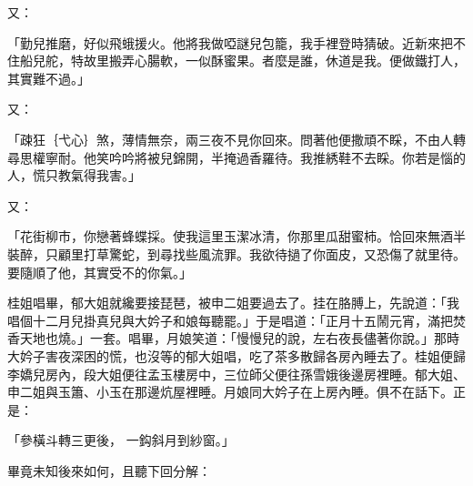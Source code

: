 又：

「勤兒推磨，好似飛蛾援火。他將我做啞謎兒包籠，我手裡登時猜破。近新來把不住船兒舵，特故里搬弄心腸軟，一似酥蜜果。者麼是誰，休道是我。便做鐵打人，其實難不過。」

又：

「疎狂｛弋心｝煞，薄情無奈，兩三夜不見你回來。問著他便撒頑不睬，不由人轉尋思權寧耐。他笑吟吟將被兒錦開，半掩過香羅待。我推綉鞋不去睬。你若是惱的人，慌只教氣得我害。」

又：

「花街柳市，你戀著蜂蝶採。使我這里玉潔冰清，你那里瓜甜蜜柿。恰回來無酒半裝醉，只顧里打草驚蛇，到尋找些風流罪。我欲待撾了你面皮，又恐傷了就里待。要隨順了他，其實受不的你氣。」

桂姐唱畢，郁大姐就纔要接琵琶，被申二姐要過去了。挂在胳膊上，先說道：「我唱個十二月兒掛真兒與大妗子和娘每聽罷。」于是唱道：「正月十五鬧元宵，滿把焚香天地也燒。」一套。唱畢，月娘笑道：「慢慢兒的說，左右夜長儘著你說。」那時大妗子害夜深困的慌，也沒等的郁大姐唱，吃了茶多散歸各房內睡去了。桂姐便歸李嬌兒房內，段大姐便往孟玉樓房中，三位師父便往孫雪娥後邊房裡睡。郁大姐、申二姐與玉簫、小玉在那邊炕屋裡睡。月娘同大妗子在上房內睡。俱不在話下。正是：

「參橫斗轉三更後，  一鈎斜月到紗窗。」

畢竟未知後來如何，且聽下回分解：


